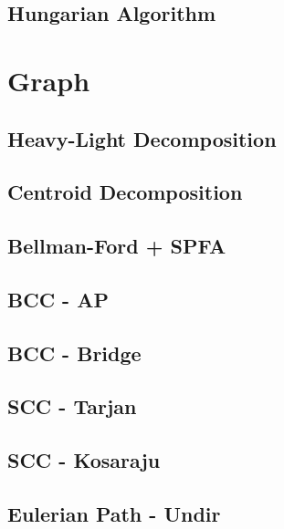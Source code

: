 \documentclass[a4paper,10pt,twocolumn,oneside,x11names]{article}
\begin{document}
\subsection{Hungarian Algorithm}



\section{Graph}

\subsection{Heavy-Light Decomposition}


\subsection{Centroid Decomposition}


\subsection{Bellman-Ford + SPFA}


\subsection{BCC - AP}


\subsection{BCC - Bridge}


\subsection{SCC - Tarjan}


\subsection{SCC - Kosaraju}


\subsection{Eulerian Path - Undir}

\end{document}
